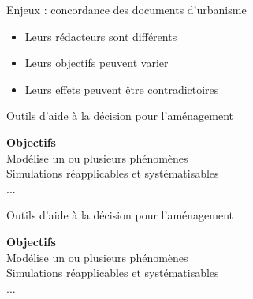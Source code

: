 \documentclass[xcolor=table]{beamer}
\begin{document}

\begin{frame}{Enjeux : concordance des documents d'urbanisme}
	\begin{itemize}
		\item Leurs rédacteurs sont différents
		\item Leurs objectifs peuvent varier
		\item Leurs effets peuvent être contradictoires
	\end{itemize}
\end{frame}

\begin{frame}{Outils d'aide à la décision pour l'aménagement}
	\begin{block}{}
		\textbf{Objectifs}\\
		Modélise un ou plusieurs phénomènes\\
		Simulations réapplicables et systématisables\\
		...
	\end{block}
\end{frame}

\begin{frame}{Outils d'aide à la décision pour l'aménagement}
\begin{block}{}
	\textbf{Objectifs}\\
	Modélise un ou plusieurs phénomènes\\
	Simulations réapplicables et systématisables\\
	...
\end{block}
\end{frame}
\end{document}
